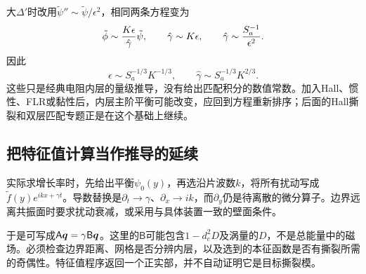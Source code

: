 大$\Delta'$时改用$\tilde\psi''\sim\tilde\psi/\epsilon^2$，相同两条方程变为
\begin{equation}
 \tilde\phi\sim{K\epsilon\over\hat\gamma}\tilde\psi,\qquad
 \hat\gamma\sim K\epsilon,\qquad
 \hat\gamma\sim{S_a^{-1}\over\epsilon^2}.
\end{equation}
因此
\begin{equation}
 \epsilon\sim S_a^{-1/3}K^{-1/3},\qquad
 \hat\gamma\sim S_a^{-1/3}K^{2/3}.
\end{equation}
这些只是经典电阻内层的量级推导，没有给出匹配积分的数值常数。加入Hall、惯性、FLR或黏性后，内层主阶平衡可能改变，应回到方程重新排序；后面的Hall撕裂和双层匹配专题正是在这个基础上继续。\citep{Baalrud2011,L262}

\subsection{把特征值计算当作推导的延续}
实际求增长率时，先给出平衡$\psi_0(y)$，再选沿片波数$k$，将所有扰动写成$\tilde f(y)e^{ikx+\gamma t}$。导数替换是$\partial_t\to\gamma$、$\partial_x\to ik$，而$\partial_y$仍是待离散的微分算子。边界远离共振面时要求扰动衰减，或采用与具体装置一致的壁面条件。

于是可写成$\mathsf A\bm{q}=\gamma\mathsf B\bm{q}$。这里的$\mathsf B$可能包含$1-d_e^2D$及涡量的$D$，不是总能量中的磁场。必须检查边界距离、网格是否分辨内层，以及选到的本征函数是否有撕裂所需的奇偶性。特征值程序返回一个正实部，并不自动证明它是目标撕裂模。
